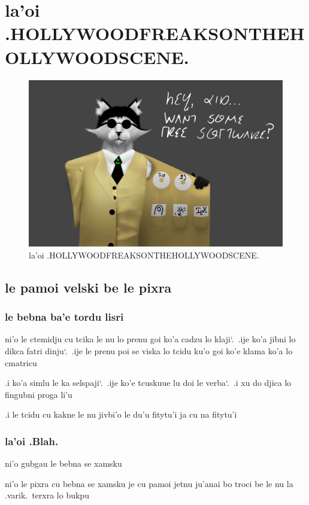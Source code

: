 \documentclass{report}
\newcommand\sds{\spacefactor\sfcode`.\ \space}
\begin{document}
\chapter{la'oi .HOLLYWOODFREAKSONTHEHOLLYWOODSCENE.}
\begin{figure}[ht]
	\centering
	\includegraphics[keepaspectratio, width=\textwidth, height=0.75\textheight]{hollywoodfreaksonthehollywoodscene/hollywoodfreaksonthehollywoodscene.png}
	\caption[center]{la'oi .HOLLYWOODFREAKSONTHEHOLLYWOODSCENE.}
\end{figure}
\section{le pamoi velski be le pixra}
\subsection{le bebna ba'e tordu lisri}
ni'o le ctemidju cu tcika le nu lo prenu goi ko'a cadzu lo klaji\sds  .ije ko'a jibni lo dikca fatri dinju\sds  .ije le prenu poi se viska lo tcidu ku'o goi ko'e klama ko'a lo cmatricu

.i ko'a simlu le ka selspaji\sds  .ije ko'e tcuskuue lu doi le verba\sds  .i xu do djica lo fingubni proga li'u

.i le tcidu cu kakne le nu jivbi'o le du'u fitytu'i ja cu na fitytu'i

\subsection{la'oi .Blah.}
ni'o gubgau le bebna se xamsku

ni'o le pixra cu bebna se xamsku je cu pamoi jetnu ju'anai bo troci be le nu la .varik.\ terxra lo bukpu
\end{document}
